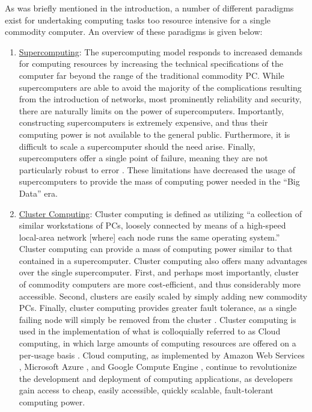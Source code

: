 As was briefly mentioned in the introduction, a number of different paradigms
exist for undertaking computing tasks too resource intensive for a single
commodity computer. An overview of these paradigms is given below:

\begin{enumerate}
  \item \underline{Supercomputing}: The supercomputing model responds to
    increased demands for computing resources by increasing the technical
    specifications of the computer far beyond the range of the
    traditional commodity PC.
    While supercomputers are able to avoid the majority of the complications
    resulting from the introduction of networks, most prominently reliability and
    security, there are naturally limits on the power of supercomputers.
    Importantly, constructing supercomputers is extremely expensive, and thus
    their computing power is not available to the general public. Furthermore,
    it is difficult to scale a supercomputer should the need arise. Finally,
    supercomputers offer a single point of failure, meaning they are not
    particularly robust to
    error \cite{cluster-computing-the-commodity-supercomputer}.
    These limitations have decreased the usage of
    supercomputers to provide the mass of computing power needed in the ``Big
    Data'' era.

  \item \underline{Cluster Computing}: Cluster computing is defined as utilizing
    ``a collection of similar workstations of PCs, loosely connected by means of
    a high-speed local-area network [where] each node runs the same operating
    system.''\cite{distributed-systems-principles-and-paradigms}
    Cluster computing can provide a mass of computing power similar to
    that contained in a supercomputer. Cluster computing also offers many
    advantages over the single supercomputer. First, and perhaps most
    importantly, cluster of commodity computers are
    more cost-efficient, and thus considerably more
    accessible. Second, clusters are easily scaled
    by simply adding new commodity PCs.
    Finally, cluster computing provides greater fault
    tolerance, as a single failing node will simply be removed
    from the cluster \cite{cluster-based-scalable-network-services}.
    Cluster computing is used in the
    implementation of what is colloquially referred to as Cloud
    computing, in which large amounts of computing resources are offered on a
    per-usage basis \cite{distributed-systems-concepts-and-design}.
    Cloud computing, as implemented by Amazon Web
    Services \cite{amazon-web-services}, Microsoft Azure \cite{microsoft-azure},
    and Google Compute Engine \cite{google-compute-engine}, continue to
    revolutionize the development and deployment of computing applications, as
    developers gain access to cheap, easily accessible, quickly scalable,
    fault-tolerant computing power.


\end{enumerate}
